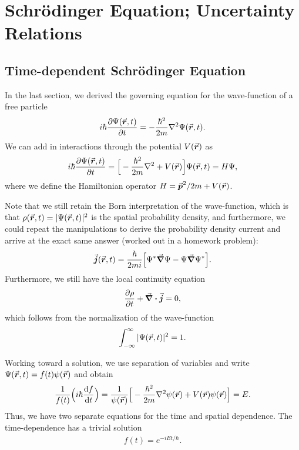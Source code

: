 \chapter{Schr\"{o}dinger Equation; Uncertainty Relations}

\section{Time-dependent Schr\"{o}dinger Equation}

In the last section, we derived the governing equation for the wave-function of a free particle
\begin{eqnarray}
    i \hbar \pdv{\Psi(\va*{r},t)}{t} = - \frac{\hbar^2}{2m} \laplacian \Psi(\va*{r},t)
.\end{eqnarray}
We can add in interactions through the potential $V(\va*{r})$ as
\begin{eqnarray}
    i \hbar \pdv{\Psi(\va*{r},t)}{t} = \Big[ - \frac{\hbar^2}{2m} \laplacian + V(\va*{r}) \Big] \Psi(\va*{r},t) = H \Psi
,\end{eqnarray}
where we define the Hamiltonian operator $H = \va*{p}^2 / 2m + V(\va*{r})$.

Note that we still retain the Born interpretation of the wave-function, which is that $\rho(\va*{r},t) = |\Psi(\va*{r},t)|^2$ is the spatial probability density, and furthermore, we could repeat the manipulations to derive the probability density current and arrive at the exact same answer (worked out in a homework problem):
\begin{eqnarray}
    \va*{j}(\va*{r},t) = \frac{\hbar}{2 m i} \Big[ \Psi^{*} \grad \Psi - \Psi \grad \Psi^{*} \Big]
.\end{eqnarray}
Furthermore, we still have the local continuity equation
\begin{eqnarray}
    \pdv{\rho}{t} + \div{\va*{j}} = 0
,\end{eqnarray}
which follows from the normalization of the wave-function
\begin{eqnarray}
    \int_{-\infty}^{\infty} |\Psi(\va*{r},t)|^2 = 1
.\end{eqnarray}

Working toward a solution, we use separation of variables and write $\Psi(\va*{r},t) = f(t) \psi(\va*{r})$ and obtain
\begin{eqnarray}
    \frac{1}{f(t)} \Big( i\hbar \dv{f}{t} \Big) = \frac{1}{\psi(\va*{r})} \Big[ -\frac{\hbar^2}{2m} \laplacian \psi(\va*{r}) + V(\va*{r}) \psi(\va*{r}) \Big] = E
.\end{eqnarray}
Thus, we have two separate equations for the time and spatial dependence.
The time-dependence has a trivial solution
\begin{eqnarray}
    f(t) = e^{-i E t / \hbar}
.\end{eqnarray}

